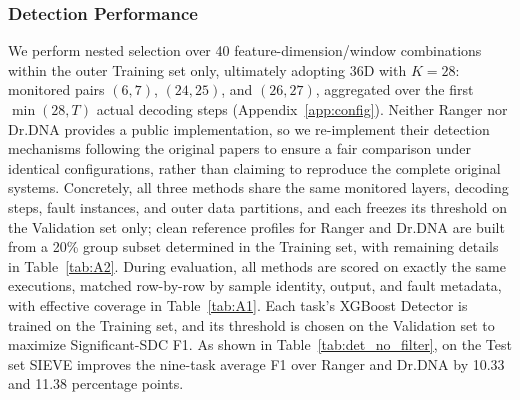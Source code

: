 \subsubsection{Detection Performance}
We perform nested selection over 40 feature-dimension/window combinations within the outer Training set only, ultimately adopting 36D with $K=28$: monitored pairs $(6,7)$, $(24,25)$, and $(26,27)$, aggregated over the first $\min(28,T)$ actual decoding steps (Appendix~\ref{app:config}). Neither Ranger nor Dr.DNA provides a public implementation, so we re-implement their detection mechanisms following the original papers to ensure a fair comparison under identical configurations, rather than claiming to reproduce the complete original systems. Concretely, all three methods share the same monitored layers, decoding steps, fault instances, and outer data partitions, and each freezes its threshold on the Validation set only; clean reference profiles for Ranger and Dr.DNA are built from a 20\% group subset determined in the Training set, with remaining details in Table~\ref{tab:A2}. During evaluation, all methods are scored on exactly the same executions, matched row-by-row by sample identity, output, and fault metadata, with effective coverage in Table~\ref{tab:A1}. Each task's XGBoost Detector is trained on the Training set, and its threshold is chosen on the Validation set to maximize Significant-SDC F1. As shown in Table~\ref{tab:det_no_filter}, on the Test set SIEVE improves the nine-task average F1 over Ranger and Dr.DNA by 10.33 and 11.38 percentage points.
